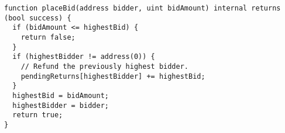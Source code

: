 \begin{lstlisting}[language=Solidity]
function placeBid(address bidder, uint bidAmount) internal returns (bool success) {
  if (bidAmount <= highestBid) {
    return false;
  }
  if (highestBidder != address(0)) {
    // Refund the previously highest bidder.
    pendingReturns[highestBidder] += highestBid;
  }
  highestBid = bidAmount;
  highestBidder = bidder;
  return true;
}
\end{lstlisting}